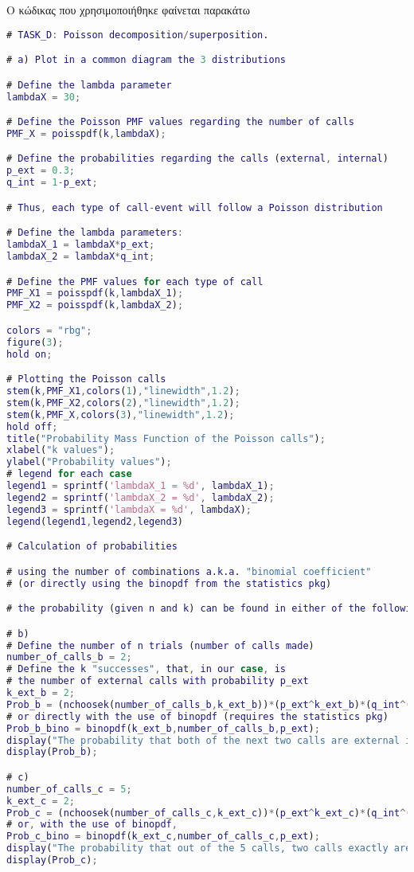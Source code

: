 \documentclass[12pt]{article}
\begin{document}
\pagebreak

Ο κώδικας που χρησιμοποιήθηκε φαίνεται παρακάτω

\begin{lstlisting}[language=Matlab]
# TASK_D: Poisson decomposition/superposition.

# a) Plot in a common diagram the 3 distributions

# Define the lambda parameter
lambdaX = 30;

# Define the Poisson PMF values regarding the number of calls
PMF_X = poisspdf(k,lambdaX);

# Define the probabilities regarding the calls (external, internal)
p_ext = 0.3;
q_int = 1-p_ext;

# Thus, each type of call-event will follow a Poisson distribution

# Define the lambda parameters:
lambdaX_1 = lambdaX*p_ext;
lambdaX_2 = lambdaX*q_int;

# Define the PMF values for each type of call
PMF_X1 = poisspdf(k,lambdaX_1);
PMF_X2 = poisspdf(k,lambdaX_2);

colors = "rbg";
figure(3);
hold on;

# Plotting the Poisson calls
stem(k,PMF_X1,colors(1),"linewidth",1.2);
stem(k,PMF_X2,colors(2),"linewidth",1.2);
stem(k,PMF_X,colors(3),"linewidth",1.2);
hold off;
title("Probability Mass Function of the Poisson calls");
xlabel("k values");
ylabel("Probability values");
# legend for each case
legend1 = sprintf('lambdaX_1 = %d', lambdaX_1);
legend2 = sprintf('lambdaX_2 = %d', lambdaX_2);
legend3 = sprintf('lambdaX = %d', lambdaX);
legend(legend1,legend2,legend3)

# Calculation of probabilities

# using the number of combinations a.k.a. "binomial coefficient"
# (or directly using the binopdf from the statistics pkg) 

# the probability (given n and k) can be found in either of the following ways:

# b)
# Define the number of n trials (number of calls made)
number_of_calls_b = 2;
# Define the k "successes", that, in our case, is
# the number of external calls with probability p_ext
k_ext_b = 2;
Prob_b = (nchoosek(number_of_calls_b,k_ext_b))*(p_ext^k_ext_b)*(q_int^(number_of_calls_b-k_ext_b));
# or directly with the use of binopdf (requires the statistics pkg)
Prob_b_bino = binopdf(k_ext_b,number_of_calls_b,p_ext);
display("The probability that both of the next two calls are external is");
display(Prob_b);

# c)
number_of_calls_c = 5;
k_ext_c = 2;
Prob_c = (nchoosek(number_of_calls_c,k_ext_c))*(p_ext^k_ext_c)*(q_int^(number_of_calls_c-k_ext_c));
# or, with the use of binopdf,
Prob_c_bino = binopdf(k_ext_c,number_of_calls_c,p_ext);
display("The probability that out of the 5 calls, two calls exactly are external, is");
display(Prob_c);
\end{lstlisting}
\end{document}
